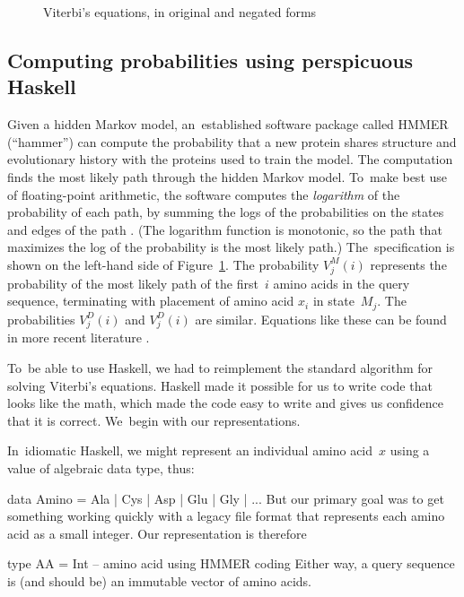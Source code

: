 \documentclass[preprint,nonatbib,blockstyle,nocopyrightspace,times]{sigplanconf}
\newcommand\figref[1]{Figure~\ref{#1}}
\newenvironment{smallverbatim}{\par\small\verbatim}{\endverbatim}
\let\cite\citep
\begin{document}
\begin{figure}
\caption{Viterbi's equations, in original and negated forms}
\label{viterbi}
\end{figure}



\subsection{Computing probabilities using perspicuous Haskell}

Given a hidden Markov model, 
an~established software package called HMMER (``hammer'') 
can compute the probability
that a new protein shares structure and
evolutionary history with the proteins used to train the model.
The computation finds the most likely path through the hidden Markov model.
To~make best use of floating-point arithmetic, the software computes
the \emph{logarithm} of the probability of each path, by summing
the logs of the 
probabilities on the states and edges of the path \cite{Viterbi:1967hq}.
(The logarithm function is monotonic, so the path that maximizes the
log of the probability is the most likely path.)
The~specification is shown on the left-hand side of \figref{viterbi}.
The probability $V_j^M(i)$ represents the probability of the most
likely path of the first~$i$ amino acids in the query sequence,
terminating with placement of amino acid $x_i$ in state~$M_j$.
The probabilities $V_j^D(i)$ and $V_j^D(i)$ are similar.
Equations like these can be found in more recent literature
\cite{Durbin:1998wz,Eddy:1998ut}. 


To~be able to use Haskell, we had to reimplement the standard
algorithm for solving Viterbi's equations.
Haskell made it possible for us to write code that looks like the
math,
which made the code easy to write and gives us confidence that it is
correct.
We~begin with our representations.

In~idiomatic Haskell, 
we might represent an individual amino acid~$x$
using a value of algebraic data type, thus:
\begin{smallverbatim}
data Amino = Ala | Cys | Asp | Glu | Gly | ...
\end{smallverbatim}
But our primary goal was to get something working quickly with a
legacy file format that represents each amino acid as a small integer.
Our representation is therefore
\begin{smallverbatim}
type AA       = Int -- amino acid using HMMER coding
\end{smallverbatim}
Either way, a query sequence is (and should be) an immutable vector of
amino acids.
\end{document}
